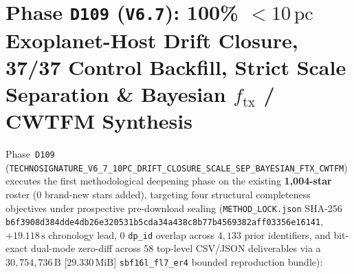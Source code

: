 \documentclass[twocolumn,10pt]{article}
\begin{document}
\section{Phase \texttt{D109} (\texttt{V6.7}): 100\% $<10\,\text{pc}$ Exoplanet-Host Drift Closure, 37/37 Control Backfill, Strict Scale Separation \& Bayesian $f_{\mathrm{tx}}$ / CWTFM Synthesis}
\label{sec:d109}
Phase~\texttt{D109} (\texttt{TECHNOSIGNATURE\_\allowbreak V6\_7\_\allowbreak 10PC\_\allowbreak DRIFT\_\allowbreak CLOSURE\_\allowbreak SCALE\_\allowbreak SEP\_\allowbreak BAYESIAN\_\allowbreak FTX\_\allowbreak CWTFM}) executes the first methodological deepening phase on the existing \textbf{1,004-star} roster ($0$ brand-new stars added), targeting four structural completeness objectives under prospective pre-download sealing (\texttt{METHOD\_LOCK.json} SHA-256 \texttt{b6f3908d\allowbreak 384dde4d\allowbreak b26e3205\allowbreak 31b5cda3\allowbreak 4a438c8b\allowbreak 77b45693\allowbreak 82aff033\allowbreak 56e16141}, $+19.118\,\text{s}$ chronology lead, $0$ \texttt{dp\_id} overlap across $4{,}133$ prior identifiers, and bit-exact dual-mode zero-diff across $58$ top-level CSV/JSON deliverables via a $30{,}754{,}736\,\text{B}$ [$29.330\,\text{MiB}$] \texttt{sbf16l\_fl7\_er4} bounded reproduction bundle):
\end{document}

